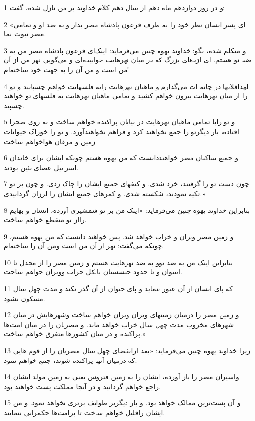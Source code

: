\par 1 و در روز دوازدهم ماه دهم از سال دهم کلام خداوند بر من نازل شده، گفت:
\par 2 «ای پسر انسان نظر خود را به طرف فرعون پادشاه مصر بدار و به ضد او و تمامی مصر نبوت نما.
\par 3 و متکلم شده، بگو: خداوند یهوه چنین می‌فرماید: اینک‌ای فرعون پادشاه مصر من به ضد تو هستم. ای اژدهای بزرگ که در میان نهرهایت خوابیده‌ای و می‌گویی نهر من از آن من است و من آن را به جهت خود ساخته‌ام!
\par 4 لهذاقلابها در چانه ات می‌گذارم و ماهیان نهرهایت رابه فلسهایت خواهم چسپانید و تو را از میان نهرهایت بیرون خواهم کشید و تمامی ماهیان نهرهایت به فلسهای تو خواهند چسپید.
\par 5 و تو رابا تمامی ماهیان نهرهایت در بیابان پراکنده خواهم ساخت و به روی صحرا افتاده، بار دیگرتو را جمع نخواهند کرد و فراهم نخواهند‌آورد. و تو را خوراک حیوانات زمین و مرغان هواخواهم ساخت.
\par 6 و جمیع ساکنان مصر خواهنددانست که من یهوه هستم چونکه ایشان برای خاندان اسرائیل عصای نئین بودند.
\par 7 چون دست تو را گرفتند، خرد شدی. و کتفهای جمیع ایشان را چاک زدی. و چون بر تو تکیه نمودند، شکسته شدی. و کمرهای جمیع ایشان را لرزان گردانیدی.»
\par 8 بنابراین خداوند یهوه چنین می‌فرماید: «اینک من بر تو شمشیری آورده، انسان و بهایم رااز تو منقطع خواهم ساخت.
\par 9 و زمین مصر ویران و خراب خواهد شد. پس خواهند دانست که من یهوه هستم، چونکه می‌گفت: نهر از آن من است ومن آن را ساخته‌ام.
\par 10 بنابراین اینک من به ضد توو به ضد نهرهایت هستم و زمین مصر را از مجدل تا اسوان و تا حدود حبشستان بالکل خراب وویران خواهم ساخت.
\par 11 که پای انسان از آن عبور ننماید و پای حیوان از آن گذر نکند و مدت چهل سال مسکون نشود.
\par 12 و زمین مصر را درمیان زمینهای ویران ویران خواهم ساخت وشهرهایش در میان شهرهای مخروب مدت چهل سال خراب خواهد ماند. و مصریان را در میان امت‌ها پراکنده و در میان کشورها متفرق خواهم ساخت.»
\par 13 زیرا خداوند یهوه چنین می‌فرماید: «بعد ازانقضای چهل سال مصریان را از قوم هایی که درمیان آنها پراکنده شوند، جمع خواهم نمود.
\par 14 واسیران مصر را باز آورده، ایشان را به زمین فتروس یعنی به زمین مولد ایشان راجع خواهم گردانید و در آنجا مملکت پست خواهند بود.
\par 15 و آن پست‌ترین ممالک خواهد بود. و بار دیگربر طوایف برتری نخواهد نمود. و من ایشان راقلیل خواهم ساخت تا برامت‌ها حکمرانی ننمایند.
